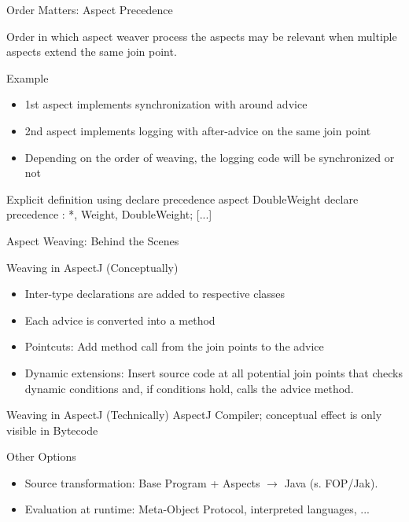 \begin{frame}[fragile]{Order Matters: Aspect Precedence}
	\begin{fancycolumns}[animation=none]
		\begin{note}{}
			Order in which aspect weaver process the aspects may be relevant when multiple aspects extend the same join point.
		\end{note}
		\begin{example}{Example}
			\begin{itemize}
				\item 1st aspect implements synchronization with around advice
				\item 2nd aspect implements logging with after-advice on the same join point
				\item Depending on the order of weaving, the logging code will be synchronized or not
			\end{itemize}
		\end{example}
	\nextcolumn
\begin{codetight}{Explicit definition using declare precedence}
aspect DoubleWeight {
	declare precedence : *, Weight, DoubleWeight;
	[...]
}
\end{codetight}	
	\end{fancycolumns}
\end{frame}

\begin{frame}{Aspect Weaving: Behind the Scenes}
	\begin{fancycolumns}[animation=none]
		\begin{definition}{Weaving in AspectJ (Conceptually)}
			\begin{itemize}
				\item Inter-type declarations are added to respective classes
				\item Each advice is converted into a method
				\item Pointcuts: Add method call from the join points to the advice
				\item Dynamic extensions: Insert source code at all potential join points that checks dynamic conditions and, if conditions hold, calls the advice method.
			\end{itemize}
		\end{definition}
	\nextcolumn
		\begin{note}{Weaving in AspectJ (Technically)}
			AspectJ Compiler; conceptual effect is only visible in Bytecode
		\end{note}
		\begin{note}{Other Options}
			\begin{itemize}
				\item Source transformation: Base Program + Aspects $\rightarrow$ Java (s. FOP/Jak).
				\item Evaluation at runtime: Meta-Object Protocol, interpreted languages, ...
			\end{itemize}
		\end{note}
	\end{fancycolumns}
\end{frame}

